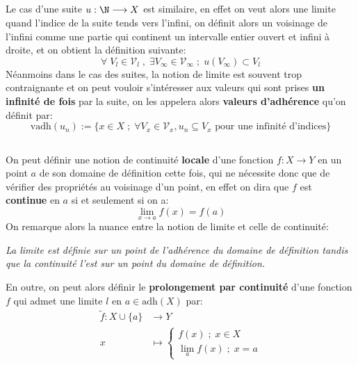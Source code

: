 \subsection*{}
Le cas d'une suite \(u : \N \longrightarrow X\) est similaire, en effet on veut alors une limite quand l'indice de la suite tends vers l'infini, on définit alors un voisinage de l'infini comme une partie qui continent un intervalle entier ouvert et infini à droite, et on obtient la définition suivante:
\[
   \forall \; V_l \in \mathscr{V}_l \; , \; \exists  V_\infty \in \mathscr{V}_\infty \; ; \; u({V_\infty}) \subset V_l 
\]
Néanmoins dans le cas des suites, la notion de limite est souvent trop contraignante et on peut vouloir s'intéresser aux valeurs qui sont prises \textbf{un infinité de fois} par la suite, on les appelera alors \textbf{valeurs d'adhérence} qu'on définit par:
\[
   \text{vadh}(u_n) := \{ x \in X \; ; \; \forall V_x \in \mathcal{V}_x , u_n \subseteq V_x \text{ pour une infinité d'indices} \}
\]
\subsection*{}
On peut définir une notion de continuité \textbf{locale} d'une fonction \(f: X \longrightarrow Y\) en un point \(a\) de son domaine de définition cette fois, qui ne nécessite donc que de vérifier des propriétés au voisinage d'un point, en effet on dira que \(f\) est \textbf{continue} en \(a\) si et seulement si on a:
\[
   \lim_{x \rightarrow a} f(x) = f(a)
\] 
On remarque alors la nuance entre la notion de limite et celle de continuité:
\begin{center}
   \textit{La limite est définie sur un point de l'adhérence du domaine de définition tandis que la continuité l'est sur un point du domaine de définition.}
\end{center}
En outre, on peut alors définir le \textbf{prolongement par continuité} d'une fonction \(f\) qui admet une limite \(l\) en \(a \in \text{adh}(X)\) par:
\[
   \begin{aligned}
      \widetilde{f}: X \cup \{a\} &\longrightarrow Y \\
      x &\longmapsto \begin{cases}
         f(x) \; ; \; x \in X\\
         \lim_{a} f(x) \; ; \; x = a
      \end{cases} 
   \end{aligned}
\]
